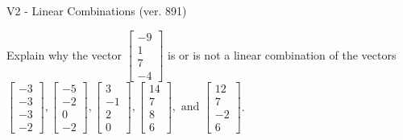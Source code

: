 \begin{exercise}
  \begin{exerciseTitle}V2 - Linear Combinations (ver. 891)\end{exerciseTitle}
  \begin{exerciseStatement}
    Explain why the vector \(\left[\begin{array}{c}
-9 \\
1 \\
7 \\
-4
\end{array}\right]\)  is or is not a linear 
	combination of the vectors \(\left[\begin{array}{c}
-3 \\
-3 \\
-3 \\
-2
\end{array}\right] , \left[\begin{array}{c}
-5 \\
-2 \\
0 \\
-2
\end{array}\right] , \left[\begin{array}{c}
3 \\
-1 \\
2 \\
0
\end{array}\right] , \left[\begin{array}{c}
14 \\
7 \\
8 \\
6
\end{array}\right] , \text{ and } \left[\begin{array}{c}
12 \\
7 \\
-2 \\
6
\end{array}\right]\).
	



\end{exerciseStatement}
\end{exercise}

